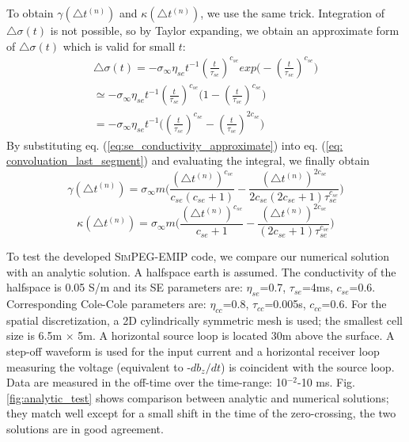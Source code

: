 \documentclass[manuscript]{geophysics}
\newcommand{\siginf}{\sigma_\infty}
\newcommand{\dsig}{\triangle\sigma}
\begin{document}
To obtain $\gamma(\triangle t^{(n)})$ and $\kappa(\triangle t^{(n)})$, we use the same trick. Integration of $\dsig(t)$ is not possible, so by Taylor expanding, we obtain an approximate form of $\dsig(t)$ which is valid for small $t$:
\begin{align}
  \dsig (t) = -\siginf \eta_{se}t^{-1}(\frac{t}{\tau_{se}})^{c_{se}}exp\Big(-(\frac{t}{\tau_{se}})^{c_{se}}\Big) \nonumber \\
  \simeq -\siginf \eta_{se}t^{-1}(\frac{t}{\tau_{se}})^{c_{se}}\Big(1-(\frac{t}{\tau_{se}})^{c_{se}}\Big) \nonumber  \\
  = -\siginf \eta_{se}t^{-1}\Big((\frac{t}{\tau_{se}})^{c_{se}}-(\frac{t}{\tau_{se}})^{2c_{se}}\Big)
  \label{eq:se_conductivity_approximate}
\end{align}
By substituting eq. (\ref{eq:se_conductivity_approximate}) into eq. (\ref{eq: convoluation_last_segment}) and evaluating the integral, we finally obtain
\begin{equation}
  \gamma(\triangle t^{(n)}) = \siginf m \Big( \frac{(\triangle t^{(n)})^{c_{se}}}{c_{se}(c_{se}+1)}-
  \frac{(\triangle t^{(n)})^{2c_{se}}}{2c_{se}(2c_{se}+1)\tau_{se}^{c_{se}}} \Big)
\end{equation}
\begin{equation}
  \kappa(\triangle t^{(n)}) = \siginf m \Big( \frac{(\triangle t^{(n)})^{c_{se}}}{c_{se}+1}-
  \frac{(\triangle t^{(n)})^{2c_{se}}}{(2c_{se}+1)\tau_{se}^{c_{se}}} \Big)
\end{equation}

\label{app: Analytic test}
To test the developed \textsc{SimPEG-EMIP} code, we compare our numerical solution with an analytic solution. A halfspace earth is assumed. The conductivity of the halfspace is 0.05 S/m and its SE parameters are: $\eta_{se}$=0.7, $\tau_{se}$=4ms, $c_{se}$=0.6. Corresponding Cole-Cole parameters are: $\eta_{cc}$=0.8, $\tau_{cc}$=0.005s, $c_{cc}$=0.6.
For the spatial discretization, a 2D cylindrically symmetric mesh is used; the smallest cell size is 6.5m $\times$ 5m.
A horizontal source loop is located 30m above the surface. A step-off waveform is used for the input current and a horizontal receiver loop measuring the voltage (equivalent to -$db_z/dt$) is coincident with the source loop. Data are measured in the off-time over the time-range: 10$^{-2}$-10 ms.
Fig. \ref{fig:analytic_test} shows comparison between analytic and numerical solutions; they match well except for a small shift in the time of the zero-crossing, the two solutions are in good agreement.
\end{document}
